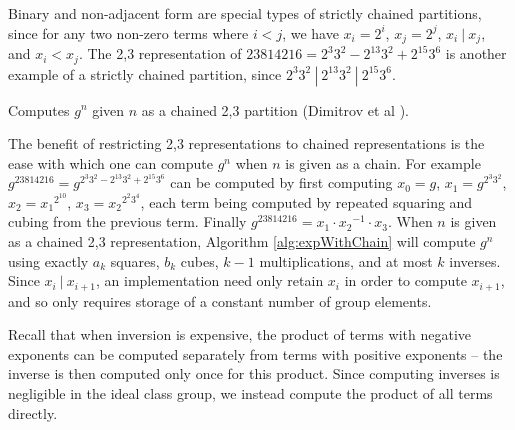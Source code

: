 \documentclass{ucalgthes1}
\theoremstyle{definition}
\newcommand{\algnewline}{\par\noindent\hskip\algorithmicindent}
\newcommand{\ZZ}{\mathbb{Z}}
\begin{document}
\noindent
Binary and non-adjacent form are special types of strictly chained partitions, since for any two non-zero terms where $i < j$, we have $x_i = 2^i$, $x_j = 2^j$, $ x_i ~|~ x_j$, and $x_i < x_j$.  The 2,3 representation of $23814216 = 2^3 3^2 - 2^{13} 3^2 + 2^{15} 3^6$ is another example of a strictly chained partition, since $2^3 3^2 ~|~ 2^{13} 3^2 ~|~ 2^{15} 3^6$.

\begin{algorithm}[htb]
\caption{Computes $g^n$ given $n$ as a chained 2,3 partition (Dimitrov et al \cite{Dimitrov2005}).}
\label{alg:expWithChain}
\end{algorithm}

The benefit of restricting 2,3 representations to chained representations is the ease with which one can compute $g^n$ when $n$ is given as a chain.  For example $g^{23814216} = g^{2^3 3^2 - 2^{13} 3^2 + 2^{15} 3^6}$ can be computed by first computing $x_0 = g$, $x_1 = g^{2^3 3^2}$, $x_2 = {x_1}^{2^{10}}$, $x_3 = {x_2}^{2^2 3^4}$, each term being computed by repeated squaring and cubing from the previous term.  Finally $g^{23814216} = x_1 \cdot {x_2}^{-1} \cdot x_3$.  When $n$ is given as a chained 2,3 representation, Algorithm \ref{alg:expWithChain} will compute $g^n$ using exactly $a_k$ squares, $b_k$  cubes, $k-1$ multiplications, and at most $k$ inverses.  Since $x_i ~|~ x_{i+1}$, an implementation need only retain $x_i$ in order to compute $x_{i+1}$, and so only requires storage of a constant number of group elements.

Recall that when inversion is expensive, the product of terms with negative exponents can be computed separately from terms with positive exponents -- the inverse is then computed only once for this product.  Since computing inverses is negligible in the ideal class group, we instead compute the product of all terms directly.
\end{document}

